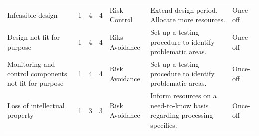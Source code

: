 \begin{appendices}
\begin{landscape}
\begin{table}[H]
{\begin{tabular}{lllllll}
Infeasible design & 1 & 4 & \cellcolor[HTML]{34FF34}4 & Risk Control & Extend design period. Allocate more resources. & Once-off \\
Design not fit for purpose & 1 & 4 & \cellcolor[HTML]{34FF34}4 & Riks Avoidance & Set up a testing procedure to identify problematic areas. & Once-off \\
Monitoring and control components not fit for purpose & 1 & 4 & \cellcolor[HTML]{34FF34}4 & Risk Avoidance & Set up a testing procedure to identify problematic areas. & Once-off \\
Loss of intellectual property & 1 & 3 & \cellcolor[HTML]{34FF34}3 & Risk Avoidance & Inform resources on a need-to-know basis regarding processing specifics. & Once-off
\end{tabular}%
}
\end{table}


\end{landscape}
\end{appendices}
